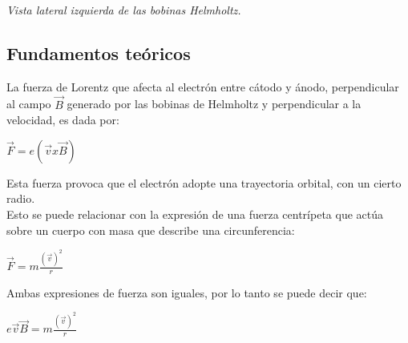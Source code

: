 \documentclass[a4paper]{article}
\begin{document}
    \begin{center}
        \textit{Vista lateral izquierda de las bobinas Helmholtz.}
    \end{center}

    \subsection{Fundamentos teóricos}
    \indent La fuerza de Lorentz que afecta al electrón entre cátodo y ánodo, perpendicular al campo $\vec{B}$ generado por las bobinas de Helmholtz y perpendicular a la velocidad, es dada por:

    \begin{center}
        $\vec{F} = e (\vec{v} x \vec{B})$ 
    \end{center}

    \indent Esta fuerza provoca que el electrón adopte una trayectoria orbital, con un cierto radio. \\
    \indent Esto se puede relacionar con la expresión de una fuerza centrípeta que actúa sobre un cuerpo con masa que describe una circunferencia:

    \begin{center}
        $\vec{F} = m {\frac {(\vec{v})^2}{r}}$
    \end{center}

    \indent Ambas expresiones de fuerza son iguales, por lo tanto se puede decir que:

    \begin{center}
        $e \vec{v} \vec{B} = m {\frac {(\vec{v})^2}{r}}$
    \end{center}
\end{document}
